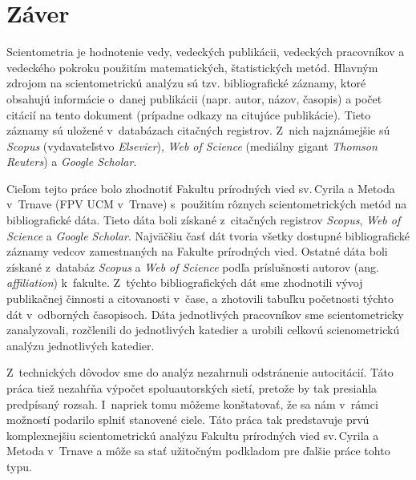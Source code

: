 \chapter*{Záver}

Scientometria je hodnotenie vedy, vedeckých publikácii, vedeckých pracovníkov a
vedeckého pokroku použitím matematických, štatistických metód. Hlavným zdrojom
na scientometrickú analýzu sú tzv. bibliografické záznamy, ktoré obsahujú
informácie o~danej publikácii (napr. autor, názov, časopis) a počet citácií na
tento dokument (prípadne odkazy na citujúce publikácie). Tieto záznamy sú
uložené v~databázach citačných registrov. Z~nich najznámejšie sú \emph{Scopus}
(vydavateľstvo \emph{Elsevier}), \emph{Web of Science} (mediálny gigant
\emph{Thomson Reuters}) a \emph{Google Scholar}.

Cieľom tejto práce bolo zhodnotiť Fakultu prírodných vied sv.\,Cyrila a Metoda
v~Trnave (FPV UCM v~Trnave) s~použitím rôznych scientometrických metód na
bibliografické dáta.  Tieto dáta boli získané z~citačných registrov
\emph{Scopus}, \emph{Web of Science} a \emph{Google Scholar}. Najväčšiu časť dát
tvoria všetky dostupné bibliografické záznamy vedcov zamestnaných na Fakulte
prírodných vied.  Ostatné dáta boli získané z~databáz \emph{Scopus} a \emph{Web
  of Science} podľa príslušnosti autorov (ang.  \emph{affiliation})
k~fakulte. Z~týchto bibliografických dát sme zhodnotili vývoj publikačnej
činnosti a citovanosti v~čase, a zhotovili tabuľku početnosti týchto dát
v~odborných časopisoch. Dáta jednotlivých pracovníkov sme scientometricky
zanalyzovali, rozčlenili do jednotlivých katedier a urobili celkovú
scienometrickú analýzu jednotlivých katedier.

Z~technických dôvodov sme do analýz nezahrnuli odstránenie autocitácií. Táto
práca tiež nezahŕňa výpočet spoluautorských sietí, pretože by tak presiahla
predpísaný rozsah.  I~napriek tomu môžeme konštatovať, že sa nám v~rámci
možností podarilo splniť stanovené ciele. Táto práca tak predstavuje prvú
komplexnejšiu scientometrickú analýzu Fakultu prírodných vied sv.\,Cyrila a
Metoda v~Trnave a môže sa stať užitočným podkladom pre ďalšie práce tohto typu.

